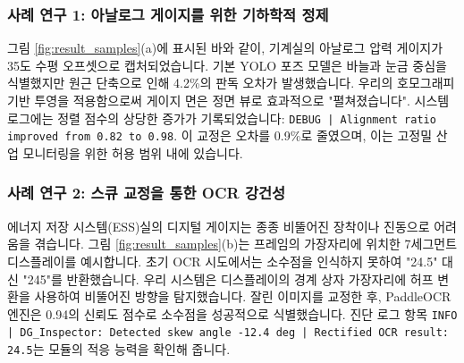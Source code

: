 \subsubsection{사례 연구 1: 아날로그 게이지를 위한 기하학적 정제}
그림 \ref{fig:result_samples}(a)에 표시된 바와 같이, 기계실의 아날로그 압력 게이지가 35도 수평 오프셋으로 캡처되었습니다.
기본 YOLO 포즈 모델은 바늘과 눈금 중심을 식별했지만 원근 단축으로 인해 4.2\%의 판독 오차가 발생했습니다.
우리의 호모그래피 기반 투영을 적용함으로써 게이지 면은 정면 뷰로 효과적으로 "펼쳐졌습니다".
시스템 로그에는 정렬 점수의 상당한 증가가 기록되었습니다: \texttt{DEBUG | Alignment ratio improved from 0.82 to 0.98}.
이 교정은 오차를 0.9\%로 줄였으며, 이는 고정밀 산업 모니터링을 위한 허용 범위 내에 있습니다.

\subsubsection{사례 연구 2: 스큐 교정을 통한 OCR 강건성}
에너지 저장 시스템(ESS)실의 디지털 게이지는 종종 비뚤어진 장착이나 진동으로 어려움을 겪습니다.
그림 \ref{fig:result_samples}(b)는 프레임의 가장자리에 위치한 7세그먼트 디스플레이를 예시합니다.
초기 OCR 시도에서는 소수점을 인식하지 못하여 "24.5" 대신 "245"를 반환했습니다.
우리 시스템은 디스플레이의 경계 상자 가장자리에 허프 변환을 사용하여 비뚤어진 방향을 탐지했습니다.
잘린 이미지를 교정한 후, PaddleOCR 엔진은 0.94의 신뢰도 점수로 소수점을 성공적으로 식별했습니다.
진단 로그 항목 \texttt{INFO | DG_Inspector: Detected skew angle -12.4 deg | Rectified OCR result: 24.5}는 모듈의 적응 능력을 확인해 줍니다.

